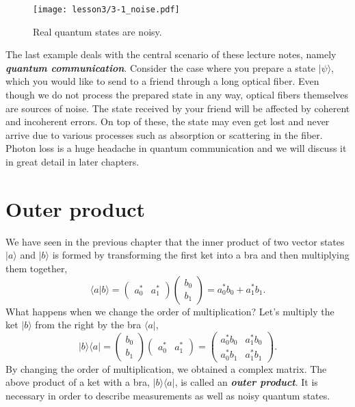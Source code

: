 \begin{figure}[t]
    \centering
    \texttt{[image: lesson3/3-1\_noise.pdf]}
    \caption[Noisy world.]{Real quantum states are noisy.}
    \label{fig:3-1_noise}
\end{figure}

The last example deals with the central scenario of these lecture notes, namely \textbf{\emph{quantum communication}}.
Consider the case where you prepare a state $|\psi\rangle$, which you would like to send to a friend through a long optical fiber.
Even though we do not process the prepared state in any way, optical fibers themselves are sources of noise.
The state received by your friend will be affected by coherent and incoherent errors.
On top of these, the state may even get lost and never arrive due to various processes such as absorption or scattering in the fiber.
Photon loss is a huge headache in quantum communication and we will discuss it in great detail in later chapters.





\section{Outer product}
\label{sec:3-2_outer_product}

We have seen in the previous chapter that the inner product of two vector states $|a\rangle$ and $|b\rangle$ is formed by transforming the first ket into a bra and then multiplying them together,
\begin{equation}
    \langle a | b\rangle = \begin{pmatrix} a_0^* & a_1^* \end{pmatrix} \begin{pmatrix} b_0 \\ b_1 \end{pmatrix} = a_0^* b_0 + a_1^* b_1.
\end{equation}
What happens when we change the order of multiplication?
Let's multiply the ket $|b\rangle$ from the right by the bra $\langle a|$,
\begin{equation}
    | b\rangle \langle a | = \begin{pmatrix} b_0 \\ b_1 \end{pmatrix} \begin{pmatrix} a_0^* & a_1^* \end{pmatrix} = \begin{pmatrix} a_0^*b_0 & a_1^*b_0 \\ a_0^*b_1 & a_1^*b_1 \end{pmatrix}.
\end{equation}
By changing the order of multiplication, we obtained a complex matrix.
The above product of a ket with a bra, $|b\rangle\langle a|$, is called an \textbf{\emph{outer product}}. It is necessary in order to describe measurements as well as noisy quantum states.

